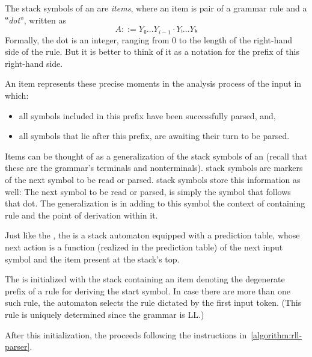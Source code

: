 The stack symbols of an \RLLp are \emph{items}, where an item is pair of a
grammar rule and a ‟\emph{dot}”, written as
\[
  A ::= Y₀…Y_{i-1}·Yᵢ…Yₖ
\]
Formally, the dot is an integer, ranging from 0 to the length of the right-hand
side of the rule. But it is better to think of it as a notation for the prefix
of this right-hand side.

An item represents these precise moments in the analysis process of the
input in which:
\begin{itemize}
  \item all symbols included in this prefix have been successfully parsed, and,
  \item all symbols that lie after this prefix, are awaiting their turn
        to be parsed.
\end{itemize}

Items can be thought of as a generalization of the stack symbols of an \LLp
(recall that these are the grammar's terminals and nonterminals). \LLp stack
symbols are markers of the next symbol to be read or parsed. \RLLp stack
symbols store this information as well: The next symbol to be read or parsed,
is simply the symbol that follows that dot. The generalization is in adding to
this symbol the context of containing rule and the point of derivation within
it.

Just like the \LLp, the \RLLp is a stack automaton equipped with a prediction
table, whose next action is a function (realized in the prediction table) of
the next input symbol and the item present at the stack's top.

The \RLLp is initialized with the stack containing an item denoting the
degenerate prefix of a rule for deriving the start symbol. In case there are
more than one such rule, the automaton selects the rule dictated by the first
input token. (This rule is uniquely determined since the grammar is LL.)

After this initialization, the \RLLp proceeds following the instructions
in~\cref{algorithm:rll-parser}.

